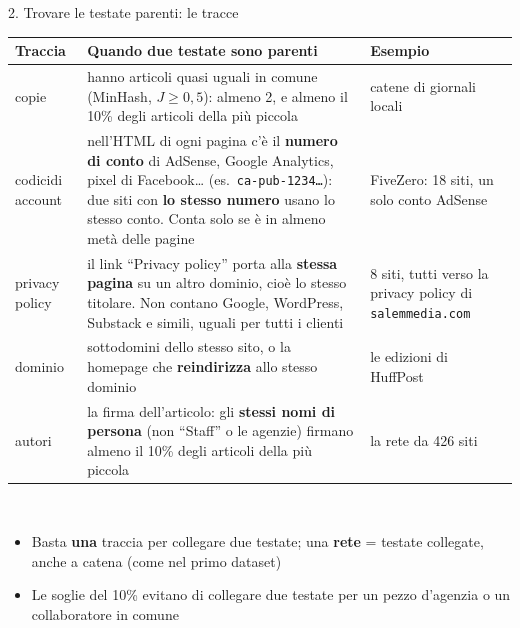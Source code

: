 \documentclass[aspectratio=169]{beamer}
\newcommand{\hl}[1]{\textbf{#1}}
\begin{document}
\begin{frame}{2. Trovare le testate parenti: le tracce}
  \vspace{0.1em}
  \centering\scriptsize
  \begin{tabular}{p{}p{}p{}}
    \toprule
    \textbf{Traccia} & \textbf{Quando due testate sono parenti} & \textbf{Esempio} \\
    \midrule
    copie & hanno articoli quasi uguali in comune (MinHash, $J \geq 0{,}5$): almeno 2, e almeno il 10\% degli articoli della pi\`u piccola & catene di giornali locali \\
    codici\newline di account & nell'HTML di ogni pagina c'\`e il \hl{numero di conto} di AdSense, Google Analytics, pixel di Facebook\dots{} (es.\ \texttt{ca-pub-1234\dots}): due siti con \hl{lo stesso numero} usano lo stesso conto. Conta solo se \`e in almeno met\`a delle pagine & FiveZero: 18 siti, un solo conto AdSense \\
    privacy policy & il link ``Privacy policy'' porta alla \hl{stessa pagina} su un altro dominio, cio\`e lo stesso titolare. Non contano Google, WordPress, Substack e simili, uguali per tutti i clienti & 8 siti, tutti verso la privacy policy di \texttt{salemmedia.com} \\
    dominio & sottodomini dello stesso sito, o la homepage che \hl{reindirizza} allo stesso dominio & le edizioni di HuffPost \\
    autori & la firma dell'articolo: gli \hl{stessi nomi di persona} (non ``Staff'' o le agenzie) firmano almeno il 10\% degli articoli della pi\`u piccola & la rete da 426 siti \\
    \bottomrule
  \end{tabular}\\[0.5em]
  \raggedright\footnotesize
  \begin{itemize}[<+->]
    \item Basta \hl{una} traccia per collegare due testate; una \hl{rete} = testate collegate, anche a catena (come nel primo dataset)
    \item Le soglie del 10\% evitano di collegare due testate per un pezzo d'agenzia o un collaboratore in comune
  \end{itemize}
\end{frame}
\end{document}
